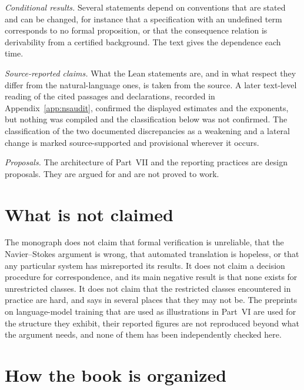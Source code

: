\emph{Conditional results.} Several statements depend on conventions that are stated and can be changed, for instance that a specification with an undefined term corresponds to no formal proposition, or that the consequence relation is derivability from a certified background. The text gives the dependence each time.

\emph{Source-reported claims.} What the Lean statements are, and in what respect they differ from the natural-language ones, is taken from the source. A later text-level reading of the cited passages and declarations, recorded in Appendix~\ref{app:nsaudit}, confirmed the displayed estimates and the exponents, but nothing was compiled and the classification below was not confirmed. The classification of the two documented discrepancies as a weakening and a lateral change is marked source-supported and provisional wherever it occurs.

\emph{Proposals.} The architecture of Part~VII and the reporting practices are design proposals. They are argued for and are not proved to work.

\section*{What is not claimed}

The monograph does not claim that formal verification is unreliable, that the Navier--Stokes argument is wrong, that automated translation is hopeless, or that any particular system has misreported its results. It does not claim a decision procedure for correspondence, and its main negative result is that none exists for unrestricted classes. It does not claim that the restricted classes encountered in practice are hard, and says in several places that they may not be. The preprints on language-model training that are used as illustrations in Part~VI are used for the structure they exhibit, their reported figures are not reproduced beyond what the argument needs, and none of them has been independently checked here.

\section*{How the book is organized}

